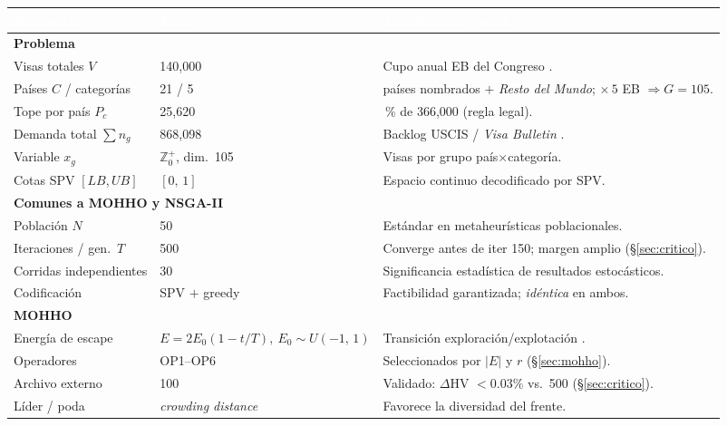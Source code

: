 \documentclass[11pt,letterpaper]{article}
\begin{document}
\begin{table}[H]
\centering
\renewcommand{\arraystretch}{1.05}
\footnotesize\linespread{1.0}\selectfont
\begin{tabular}{l l >{\raggedright\arraybackslash}p{6.1cm}}
\toprule
\rowcolor{tablehead}
\textcolor{white}{\textbf{Parámetro}} & \textcolor{white}{\textbf{Valor}} & \textcolor{white}{\textbf{Justificación / nota}}\\
\midrule
\multicolumn{3}{l}{\cellcolor{headerblue!14}\textbf{Problema}}\\
Visas totales $V$ & 140{,}000 & Cupo anual EB del Congreso \parencite{crs2023}.\\
Países $C$ / categorías & 21 / 5 & 20 países nombrados $+$ \textit{Resto del Mundo}; $\times\,5$ EB $\Rightarrow G=105$.\\
Tope por país $P_c$ & 25{,}620 & 7\,\% de 366{,}000 (regla legal).\\
Demanda total $\sum n_g$ & 868{,}098 & Backlog USCIS / \textit{Visa Bulletin} \parencite{dosfeb2026,uscis2023}.\\
Variable $x_g$ & $\mathbb{Z}^{+}_0$, dim.\ 105 & Visas por grupo país$\times$categoría.\\
Cotas SPV $[LB,UB]$ & $[0,\,1]$ & Espacio continuo decodificado por SPV.\\
\midrule
\multicolumn{3}{l}{\cellcolor{sectiongreen!16}\textbf{Comunes a MOHHO y NSGA-II}}\\
Población $N$ & 50 & Estándar en metaheurísticas poblacionales.\\
Iteraciones / gen.\ $T$ & 500 & Converge antes de iter 150; margen amplio (§\ref{sec:critico}).\\
Corridas independientes & 30 & Significancia estadística de resultados estocásticos.\\
Codificación & SPV $+$ greedy & Factibilidad garantizada; \emph{idéntica} en ambos.\\
\midrule
\multicolumn{3}{l}{\cellcolor{exampleborder!22}\textbf{MOHHO}}\\
Energía de escape & $E=2E_0(1-t/T),\ E_0\!\sim\!U(-1,\,1)$ & Transición exploración/explotación \parencite{heidari2019}.\\
Operadores & OP1--OP6 & Seleccionados por $|E|$ y $r$ (§\ref{sec:mohho}).\\
Archivo externo & 100 & Validado: $\Delta$HV $<0.03\%$ vs.\ 500 (§\ref{sec:critico}).\\
Líder / poda & \textit{crowding distance} & Favorece la diversidad del frente.\\

\end{tabular}
\end{table}
\end{document}
